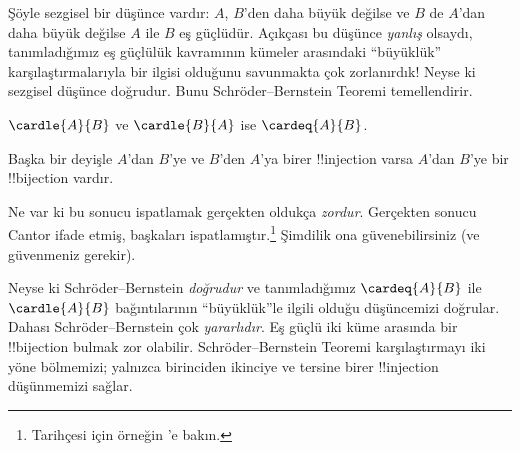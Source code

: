 



\begin{explain}
Şöyle sezgisel bir düşünce vardır: $A$, $B$'den daha büyük değilse ve $B$ de
$A$'dan daha büyük değilse $A$ ile $B$ eş güçlüdür. Açıkçası bu düşünce
\emph{yanlış} olsaydı, tanımladığımız eş güçlülük kavramının kümeler
arasındaki ``büyüklük'' karşılaştırmalarıyla bir ilgisi olduğunu savunmakta
çok zorlanırdık!{} Neyse ki sezgisel düşünce doğrudur. Bunu
Schr\"oder--Bernstein Teoremi temellendirir.
\end{explain}

\begin{thm}
	$\cardle{A}{B}$ ve $\cardle{B}{A}$ ise $\cardeq{A}{B}$.
\end{thm}

\begin{explain}
Başka bir deyişle $A$'dan $B$'ye ve $B$'den $A$'ya birer !!{injection}
varsa $A$'dan $B$'ye bir !!{bijection} vardır.

Ne var ki bu sonucu ispatlamak gerçekten oldukça \emph{zordur}. Gerçekten
sonucu Cantor ifade etmiş, başkaları ispatlamıştır.\footnote{Tarihçesi için
örneğin \citet[pp.~165--6]{Potter2004}'e bakın.}
%
Şimdilik ona güvenebilirsiniz (ve güvenmeniz gerekir).

Neyse ki Schr\"oder--Bernstein \emph{doğrudur} ve tanımladığımız
$\cardeq{A}{B}$ ile $\cardle{A}{B}$ bağıntılarının ``büyüklük''le ilgili
olduğu düşüncemizi doğrular. Dahası Schr\"oder--Bernstein çok
\emph{yararlıdır}. Eş güçlü iki küme arasında bir !!{bijection} bulmak zor
olabilir. Schr\"oder--Bernstein Teoremi karşılaştırmayı iki yöne bölmemizi;
yalnızca birinciden ikinciye ve tersine birer !!{injection} düşünmemizi sağlar.
\end{explain}
